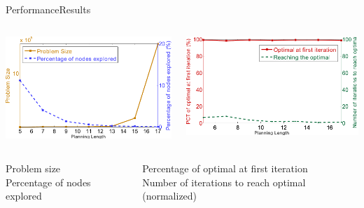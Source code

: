 \begin{frame}{Performance}{Results}

\begin{columns}
\begin{minipage}{\textwidth}
\includegraphics[width=\textwidth]{./figure/T_ProbSize_ExpRatio}
\end{minipage}
\begin{minipage}{\textwidth}
\includegraphics[width=\textwidth]{./figure/T_InitOpt_OptRch}
\end{minipage}
\end{columns}

\begin{columns}
\begin{center}
{\small 
\textcolor{metric-PR}{Problem size} \\
\textcolor{metric-NE}{Percentage of nodes explored}
}
\end{center}
\begin{center}
{\small 
\textcolor{metric-OFI}{Percentage of optimal at first iteration} \\
\textcolor{metric-IRO}{Number of iterations to reach optimal (normalized)}
}
\end{center}
\end{columns}

\end{frame}

